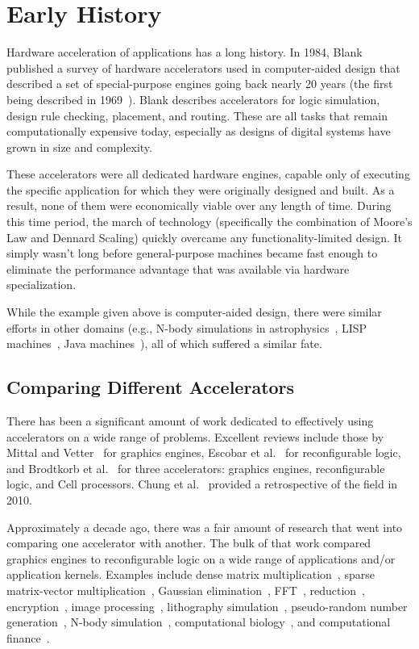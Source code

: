 \section{Early History}
\label{sec:history}

Hardware acceleration of applications has a long history.
In 1984, Blank~\cite{Blank84}
published a survey of hardware accelerators used in computer-aided design 
that described a set of special-purpose engines going back nearly 20 years
(the first being described in 1969~\cite{McKay69}).
Blank describes accelerators for logic simulation, design rule checking,
placement, and routing. These are all tasks that remain computationally
expensive today, especially as designs of digital systems have grown in size
and complexity.

These accelerators were all dedicated hardware engines, capable only
of executing the specific application for which they were originally designed
and built. As a result, none of them were economically viable over any
length of time.  During this time period, the march of technology (specifically
the combination of Moore's Law and Dennard Scaling) quickly
overcame any functionality-limited design.  It simply wasn't long
before general-purpose machines became fast enough to eliminate the
performance advantage that was available via hardware specialization.

While the example given above is computer-aided design, there were similar
efforts in other domains (e.g., N-body simulations in
astrophysics~\cite{grapenature,grape},
LISP machines~\cite{lisp,alphalisp},
Java machines~\cite{java,Schoeberl08}),
all of which suffered a similar fate.

\subsection{Comparing Different Accelerators}
\label{sec:compare}

There has been a significant amount of work dedicated to effectively
using accelerators on a wide range of problems.  Excellent reviews
include those by Mittal and Vetter~\cite{mv15} for graphics engines,
Escobar et al.~\cite{ecv16} for reconfigurable logic, and
Brodtkorb et al.~\cite{bdh+10} for three accelerators: graphics engines,
reconfigurable logic, and Cell processors.
Chung et al.~\cite{cmhm10} provided a retrospective of the field in 2010.

Approximately a decade ago, there was a fair amount of research that
went into comparing one accelerator with another.  The bulk of that
work compared graphics engines to reconfigurable logic on a wide range
of applications and/or application kernels.
Examples include dense matrix multiplication~\cite{cmhm10,jpbc10},
sparse matrix-vector multiplication~\cite{sww+10},
Gaussian elimination~\cite{cls+08},
FFT~\cite{cmhm10},
reduction~\cite{jpbc10},
encryption~\cite{cls+08},
image processing~\cite{amy09,bnw+10},
lithography simulation~\cite{cz09},
pseudo-random number generation~\cite{jpbc10,tb09,thl09},
N-body simulation~\cite{jpbc10},
computational biology~\cite{cls+08}, and
computational finance~\cite{cmhm10,tb10}.

